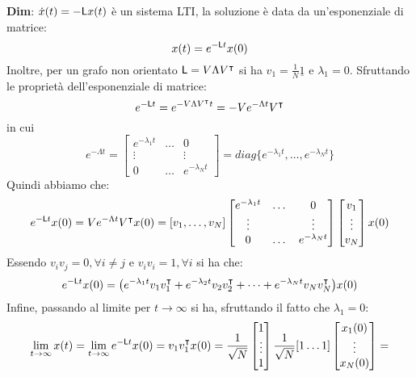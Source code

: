 \begin{tcolorbox}
\textbf{Dim}: $\dot{x}(t) = - \mathsf{L} x(t)$ \`e un sistema LTI, la soluzione \`e data da un'esponenziale di matrice:
\begin{equation}
x(t) = e^{- \mathsf{L} t}x(0)
\end{equation}
Inoltre, per un grafo non orientato $\mathsf{L} = V \Lambda V^\intercal$  si ha $v_1 = \frac{1}{N} \underline{1}$ e $\lambda_1 = 0$. Sfruttando le propriet\`a dell'esponenziale di matrice:
\begin{equation}
e^{-\mathsf{L} t} = e^{- V \Lambda V^\intercal t} = -V e^{-\Lambda t} V^\intercal
\end{equation}
in cui
\begin{equation}
e^{-\Lambda t} = \begin{bmatrix}
e^{-\lambda_1 t} & \dots & 0 \\
\vdots & & \vdots \\
0 & \dots & e^{-\lambda_Nt}
\end{bmatrix} = diag\{e^{-\lambda_1t}, \dots, e^{-\lambda_Nt} \}
\end{equation}
Quindi abbiamo che:
\begin{equation}
e^{-\mathsf{L} t}x(0) = V e^{-\Lambda t} V^\intercal x(0) =
[v_1, \dots, v_N]
\begin{bmatrix}
e^{-\lambda_1t} & \dots & 0 \\
\vdots & & \vdots \\
0 & \dots & e^{-\lambda_Nt}
\end{bmatrix} \begin{bmatrix} v_1 \\ \vdots \\ v_N \end{bmatrix} x(0)
\end{equation}
Essendo $v_i v_j = 0, \forall i\neq j$ e $v_i v_i =1, \forall i$ si ha che:
\begin{equation}
e^{-\mathsf{L} t}x(0) = \big ( e^{-\lambda_1 t}v_1 v_1^\intercal + e^{-\lambda_2 t} v_2 v_2^\intercal + \dots + e^{-\lambda_N t} v_N v_N^\intercal \big ) x(0)
\end{equation}
Infine, passando al limite per $t \to \infty$ si ha, sfruttando il fatto che $\lambda_1 = 0$:
\begin{align*}
\lim_{t \to \infty} x(t) &= \lim_{t \to \infty} e^{-\lap t}x(0) = v_1 v_1^\intercal x(0) = \frac{1}{\sqrt{N}} \begin{bmatrix} 1 \\ \vdots \\ 1 \end{bmatrix} \frac{1}{\sqrt{N}}[1 \dots 1] \begin{bmatrix} x_1(0) \\ \vdots \\ x_N(0) \end{bmatrix} = \\

\end{align*}
\end{tcolorbox}
